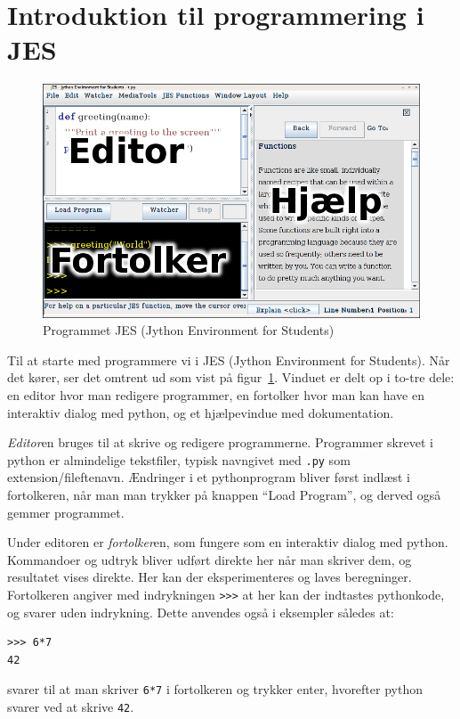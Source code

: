 \documentclass[10pt]{article}
\begin{document}
\section{Introduktion til programmering i JES}
\begin{figure}
\begin{center}
\includegraphics[width=350pt]{JESdesc.png}
\caption{Programmet JES (Jython Environment for Students)}
\label{JES}
\end{center}
\end{figure}

Til at starte med programmere vi i JES (Jython Environment for Students).
Når det kører, ser det omtrent ud som vist på figur~\ref{JES}.
Vinduet er delt op i to-tre dele: en editor hvor man redigere programmer, en fortolker hvor man kan have en interaktiv dialog med python, og et hjælpevindue med dokumentation.

\emph{Editor}en bruges til at skrive og redigere programmerne. Programmer skrevet i python er almindelige tekstfiler, typisk navngivet med \verb|.py| som extension/fileftenavn.
Ændringer i et pythonprogram bliver først indlæst i fortolkeren, når man man trykker på knappen ``Load Program'', og derved også gemmer programmet.

Under editoren er \emph{fortolker}en, som fungere som en interaktiv dialog med python. Kommandoer og udtryk bliver udført direkte her når man skriver dem, og resultatet vises direkte. Her kan der eksperimenteres og laves beregninger.
Fortolkeren angiver med indrykningen \verb|>>>| at her kan der indtastes pythonkode, og svarer uden indrykning. Dette anvendes også i eksempler således at:
\begin{verbatim}
>>> 6*7
42
\end{verbatim}
svarer til at man skriver \verb|6*7| i fortolkeren og trykker enter, hvorefter python svarer ved at skrive \verb|42|.
\end{document}
